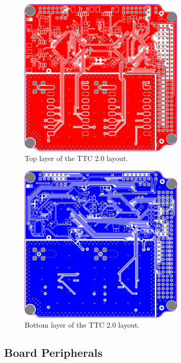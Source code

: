 \begin{figure}[!ht]
    \begin{center}
        \includegraphics[width=0.7\textwidth]{figures/ttc2-layout-top.png}
        \caption{Top layer of the TTC 2.0 layout.}
        \label{fig:ttc2-layout-top}
    \end{center}
\end{figure}

\begin{figure}[!ht]
    \begin{center}
        \includegraphics[width=0.7\textwidth]{figures/ttc2-layout-bottom.png}
        \caption{Bottom layer of the TTC 2.0 layout.}
        \label{fig:ttc2-layout-bottom}
    \end{center}
\end{figure}

\subsection{Board Peripherals}

